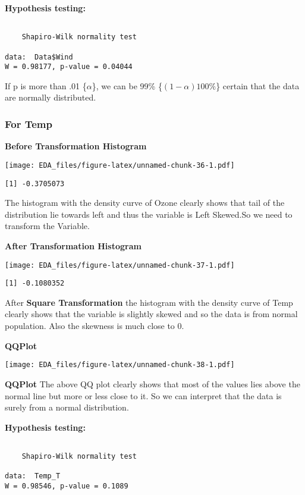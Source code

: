 \documentclass[12pt,]{article}
\begin{document}
\textbf{Hypothesis testing:}

\begin{verbatim}

    Shapiro-Wilk normality test

data:  Data$Wind
W = 0.98177, p-value = 0.04044
\end{verbatim}

If p is more than .01 \{\(\alpha\)\}, we can be 99\%
\{\((1-\alpha)100\%\)\} certain that the data are normally distributed.

\subsubsection{\texorpdfstring{\textbf{For
Temp}}{For Temp}}\label{for-temp}

\textbf{Before Transformation Histogram}

\texttt{[image: EDA\_files/figure-latex/unnamed-chunk-36-1.pdf]}

\begin{verbatim}
[1] -0.3705073
\end{verbatim}

The histogram with the density curve of Ozone clearly shows that tail of
the distribution lie towards left and thus the variable is Left
Skewed.So we need to transform the Variable.

\textbf{After Transformation Histogram}

\texttt{[image: EDA\_files/figure-latex/unnamed-chunk-37-1.pdf]}

\begin{verbatim}
[1] -0.1080352
\end{verbatim}

After \textbf{Square Transformation} the histogram with the density
curve of Temp clearly shows that the variable is slightly skewed and so
the data is from normal population. Also the skewness is much close to
0.

\textbf{QQPlot}

\texttt{[image: EDA\_files/figure-latex/unnamed-chunk-38-1.pdf]}

\textbf{QQPlot} The above QQ plot clearly shows that most of the values
lies above the normal line but more or less close to it. So we can
interpret that the data is surely from a normal distribution.

\textbf{Hypothesis testing:}

\begin{verbatim}

    Shapiro-Wilk normality test

data:  Temp_T
W = 0.98546, p-value = 0.1089
\end{verbatim}
\end{document}
